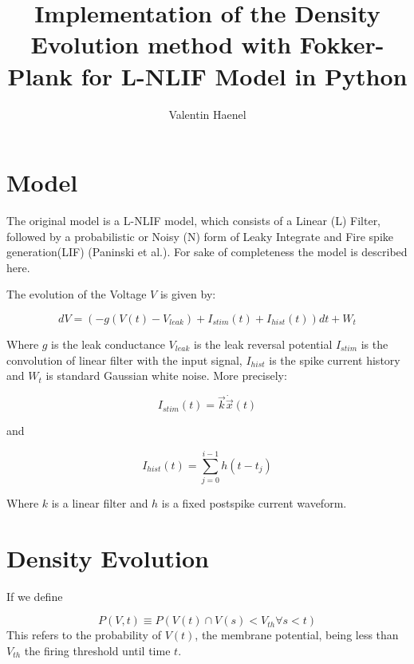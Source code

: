 \documentclass[10pt]{article}
\title{Implementation of the Density Evolution method with
Fokker-Plank for L-NLIF Model in Python}
\author{Valentin Haenel}
\begin{document}
 

\maketitle

\section{Model}
The original model is a L-NLIF model, which consists of a Linear
(L) Filter, followed by a probabilistic or Noisy (N) form of Leaky
Integrate and Fire spike generation(LIF) (Paninski et
al.\cite{PaninskiPillowSimoncelli}). For sake of completeness the
model is described here.

The evolution of the Voltage $V$ is given by:

\begin{equation}
    dV = (-g(V(t) -V_{leak}) +I_{stim}(t) + I_{hist}(t)) dt + W_{t}
\end{equation}

Where $g$ is the leak conductance $V_{leak}$ is the leak reversal
potential $I_{stim}$ is the convolution of linear filter with the
input signal, $I_{hist}$ is the spike current history and $W_t$ is
standard Gaussian white noise. More precisely:

\begin{equation}
    I_{stim}(t) = \vec{k} \dot \vec{x}(t)
\end{equation}

and

\begin{equation}
    I_{hist}(t) = \sum_{j=0}^{i-1}h(t-t_j)
\end{equation}

Where $k$ is a linear filter and $h$ is a fixed postspike current waveform. 



\section{Density Evolution}


If we define 

\begin{equation}
    P(V,t) \equiv P(V(t) \cap  V(s) < V_{th} \forall s < t)
\end{equation}
This refers to the probability of $V(t)$, the membrane potential,
being less than $V_{th}$ the firing threshold until time $t$.  
\end{document}
